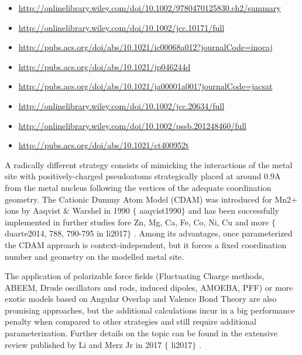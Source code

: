 \begin{itemize}
	\item \href{http://onlinelibrary.wiley.com/doi/10.1002/9780470125830.ch2/summary}{http://onlinelibrary.wiley.com/doi/10.1002/9780470125830.ch2/summary}

	\item \href{http://onlinelibrary.wiley.com/doi/10.1002/jcc.10171/full}{http://onlinelibrary.wiley.com/doi/10.1002/jcc.10171/full}

	\item \href{http://pubs.acs.org/doi/abs/10.1021/ic00068a012?journalCode=inocaj}{http://pubs.acs.org/doi/abs/10.1021/ic00068a012?journalCode=inocaj}

	\item \href{http://pubs.acs.org/doi/abs/10.1021/jp046244d}{http://pubs.acs.org/doi/abs/10.1021/jp046244d}

	\item \href{http://pubs.acs.org/doi/abs/10.1021/ja00001a001?journalCode=jacsat}{http://pubs.acs.org/doi/abs/10.1021/ja00001a001?journalCode=jacsat}

	\item \href{http://onlinelibrary.wiley.com/doi/10.1002/jcc.20634/full}{http://onlinelibrary.wiley.com/doi/10.1002/jcc.20634/full}

	\item \href{http://onlinelibrary.wiley.com/doi/10.1002/pssb.201248460/full}{http://onlinelibrary.wiley.com/doi/10.1002/pssb.201248460/full}

	\item \href{http://pubs.acs.org/doi/abs/10.1021/ct400952t}{http://pubs.acs.org/doi/abs/10.1021/ct400952t}
\end{itemize}

A radically different strategy consists of mimicking the interactions of the metal site with positively-charged pseudoatoms strategically placed at around 0.9A from the metal nucleus following the vertices of the adequate coordination geometry. The Cationic Dummy Atom Model (CDAM) was introduced for Mn2+ ions by Aaqvist $\&$  Warshel in 1990 $ \{ $ aaqvist1990$ \} $  and has been successfully implemented in further studies fore Zn, Mg, Ca, Fe, Co, Ni, Cu and more $ \{ $ duarte2014, 788, 790-795 in li2017$ \} $ . Among its advantages, once parameterized the CDAM approach is context-independent, but it forces a fixed coordination number and geometry on the modelled metal site.

The application of polarizable force fields (Fluctuating Charge methods, ABEEM, Drude oscillators and rods, induced dipoles, AMOEBA, PFF) or more exotic models based on Angular Overlap and Valence Bond Theory are also promising approaches, but the additional calculations incur in a big performance penalty when compared to other strategies and still require additional parameterization. Further details on the topic can be found in the extensive review published by Li and Merz Jr in 2017 $ \{ $ li2017$ \} $ .

